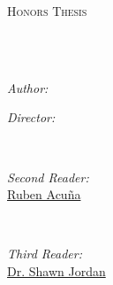 \documentclass[
11pt, %
oneside, %
english, %
singlespacing, %
final, %
headsepline, %
]{MastersDoctoralThesis} %
\author{Dylan \textsc{Lathrum}} %
\begin{document}
\frontmatter %

\pagestyle{plain} %


\begin{titlepage}
	\begin{center}

		\vspace*{.06\textheight}
		{\scshape\LARGE \univname\par}\vspace{1.5cm} %
		\textsc{\Large Honors Thesis}\\[0.5cm] %

		\HRule \\[0.4cm] %
		{\huge \bfseries \ttitle\par}\vspace{0.4cm} %
		\HRule \\[1.5cm] %

		\begin{minipage}[t]{0.4\textwidth}
			\begin{flushleft} \large
				\emph{Author:}\\
				\href{https://www.linkedin.com/in/dylanlathrum/}{\authorname} %
			\end{flushleft}
		\end{minipage}
		\begin{minipage}[t]{0.4\textwidth}
			\begin{flushright} \large
				\emph{Director:} \\
				\href{https://isearch.asu.edu/profile/3180015}{\supname} %
			\end{flushright}
		\end{minipage}\\[.5cm]

		\begin{minipage}[t]{0.8\textwidth}
			\begin{flushright} \large
				\emph{Second Reader:}\\
				\href{https://isearch.asu.edu/profile/1232839/}{Ruben Acu\~{n}a}
			\end{flushright}
		\end{minipage}\\[.5cm]
		\begin{minipage}[t]{0.8\textwidth}
			\begin{flushright} \large
				\emph{Third Reader:} \\
				\href{https://isearch.asu.edu/profile/1625795}{Dr. Shawn Jordan}
			\end{flushright}
		\end{minipage}\\[3cm]


\end{center}
\end{titlepage}
\end{document}
